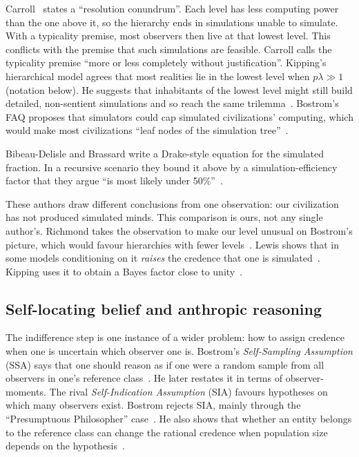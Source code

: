 Carroll~\cite{Carroll2016maybe} states a ``resolution conundrum''. Each level has less
computing power than the one above it, so the hierarchy ends in simulations unable to
simulate. With a typicality premise, most observers then live at that lowest level. This
conflicts with the premise that such simulations are feasible. Carroll calls the
typicality premise ``more or less completely without justification''. Kipping's
hierarchical model agrees that most realities lie in the lowest level when $p\lambda\gg1$
(notation below). He suggests that inhabitants of the lowest level might still build
detailed, non-sentient simulations and so reach the same
trilemma~\cite[\S\,2.3]{Kipping2020bayesian}. Bostrom's FAQ proposes that simulators could
cap simulated civilizations' computing, which would make most civilizations ``leaf nodes
of the simulation tree''~\cite[Q6]{Bostrom2025simulation}.

Bibeau-Delisle and Brassard write a Drake-style equation for the simulated fraction. In
a recursive scenario they bound it above by a simulation-efficiency factor that they
argue ``is most likely under 50\%''~\cite{BibeauDelisle2021probability}.

These authors draw different conclusions from one observation: our civilization has not
produced simulated minds. This comparison is ours, not any single author's. Richmond takes
the observation to make our level unusual on Bostrom's picture, which would favour
hierarchies with fewer levels~\cite{Richmond2008doomsday}. Lewis shows that in some models
conditioning on it \emph{raises} the credence that one is simulated~\cite{Lewis2013doomsday}.
Kipping uses it to obtain a Bayes factor close to unity~\cite{Kipping2020bayesian}.

\subsection{Self-locating belief and anthropic reasoning}
\label{sec:philosophy:anthropics}

The indifference step is one instance of a wider problem: how to assign credence when
one is uncertain which observer one is. Bostrom's \emph{Self-Sampling Assumption} (SSA)
says that one should reason as if one were a random sample from all observers in one's
reference class~\cite[p.~57]{Bostrom2002anthropic}. He later restates it in terms of
observer-moments. The rival \emph{Self-Indication Assumption} (SIA) favours hypotheses on
which many observers exist. Bostrom rejects SIA, mainly through the ``Presumptuous
Philosopher'' case~\cite[pp.~66, 124--125]{Bostrom2002anthropic}. He also shows that
whether an entity belongs to the reference class can change the rational credence when
population size depends on the hypothesis~\cite[pp.~69--71]{Bostrom2002anthropic}.

